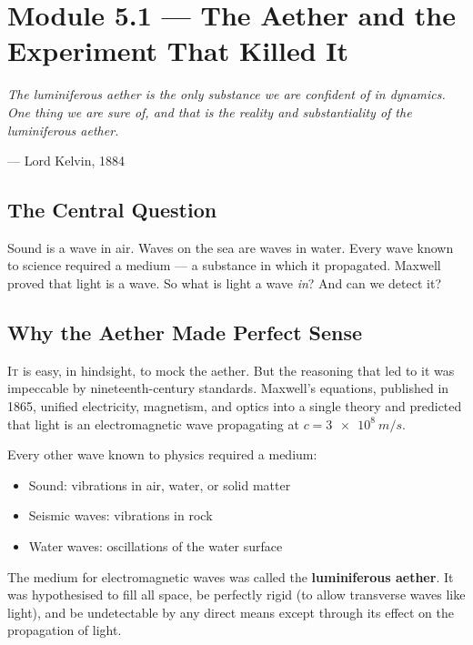 \documentclass[12pt, a4paper, twoside]{book}
\begin{document}
\section{Module 5.1 — The Aether and the Experiment That Killed It}
\label{sec:aether}

\epigraph{\itshape
  The luminiferous aether is the only substance we are confident of in dynamics.
  One thing we are sure of, and that is the reality and substantiality of the
  luminiferous aether.
}{--- Lord Kelvin, 1884}

\subsection{The Central Question}

\begin{puzzlebox}
Sound is a wave in air. Waves on the sea are waves in water. Every wave known to science required a medium --- a substance in which it propagated. Maxwell proved that light is a wave. So what is light a wave \textit{in}? And can we detect it?
\end{puzzlebox}

\subsection{Why the Aether Made Perfect Sense}

\lettrine[lines=3,loversize=0.08]{\textcolor{accent}{I}}{t} is easy, in hindsight, to mock the aether. But the reasoning that led to it was impeccable by nineteenth-century standards. Maxwell's equations, published in 1865, unified electricity, magnetism, and optics into a single theory and predicted that light is an electromagnetic wave propagating at $c = \SI{3e8}{m/s}$.

Every other wave known to physics required a medium:
\begin{itemize}[leftmargin=2em,itemsep=2pt]
  \item Sound: vibrations in air, water, or solid matter
  \item Seismic waves: vibrations in rock
  \item Water waves: oscillations of the water surface
\end{itemize}

The medium for electromagnetic waves was called the \textbf{luminiferous aether}. It was hypothesised to fill all space, be perfectly rigid (to allow transverse waves like light), and be undetectable by any direct means except through its effect on the propagation of light.
\end{document}
